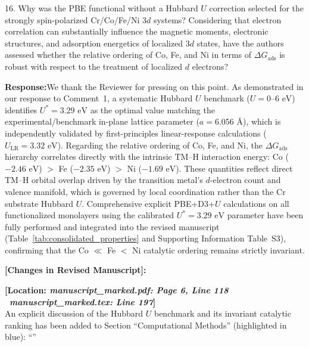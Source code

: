 \documentclass[11pt, sans, a4paper]{moderncv}
\newcommand{\response}{\vspace{0.4em}\noindent\textbf{\color{actionblue}Response:}\hspace{0.5em}}
\newcommand{\manuscriptchange}[1]{{\renewcommand{\label}[1]{}\vspace{0.4em}\noindent\textbf{\color{acsblue}[Changes in Revised Manuscript]:}\par\nopagebreak\vspace{0.15em}#1\vspace{0.4em}}}
\begin{document}
\vspace{0.8em}

\begin{reviewercomment}
16. Why was the PBE functional without a Hubbard $U$ correction selected for the strongly spin-polarized Cr/Co/Fe/Ni $3d$ systems? Considering that electron correlation can substantially influence the magnetic moments, electronic structures, and adsorption energetics of localized $3d$ states, have the authors assessed whether the relative ordering of Co, Fe, and Ni in terms of $\Delta G_{\mathrm{ads}}$ is robust with respect to the treatment of localized $d$ electrons?
\end{reviewercomment}

\response We thank the Reviewer for pressing on this point. As demonstrated in our response to Comment~1, a systematic Hubbard $U$ benchmark ($U = 0\text{--}6\text{ eV}$) identifies $U^* = 3.29\text{ eV}$ as the optimal value matching the experimental/benchmark in-plane lattice parameter ($a = 6.056\text{ \AA}$), which is independently validated by first-principles linear-response calculations ($U_{\text{LR}} = 3.32\text{ eV}$). Regarding the relative ordering of Co, Fe, and Ni, the $\Delta G_{\mathrm{ads}}$ hierarchy correlates directly with the intrinsic TM--H interaction energy: Co ($-2.46\text{ eV}$) $>$ Fe ($-2.35\text{ eV}$) $>$ Ni ($-1.69\text{ eV}$). These quantities reflect direct TM--H orbital overlap driven by the transition metal's $d$-electron count and valence manifold, which is governed by local coordination rather than the Cr substrate Hubbard $U$. Comprehensive explicit PBE+D3+$U$ calculations on all functionalized monolayers using the calibrated $U^* = 3.29\text{ eV}$ parameter have been fully performed and integrated into the revised manuscript (Table~\ref{tab:consolidated_properties} and Supporting Information Table~S3), confirming that the Co $\ll$ Fe $<$ Ni catalytic ordering remains strictly invariant.

\manuscriptchange{\textbf{[Location: \textit{manuscript\_marked.pdf: Page 6, Line 118} \textbar\ \textit{manuscript\_marked.tex: Line 197}]}\\ An explicit discussion of the Hubbard $U$ benchmark and its invariant catalytic ranking has been added to Section ``Computational Methods'' (highlighted in blue): ``{\itshape \ExecuteMetaData[manuscript_marked.tex]{PBEHubbardU}}''}

\vspace{0.8em}
\end{document}
